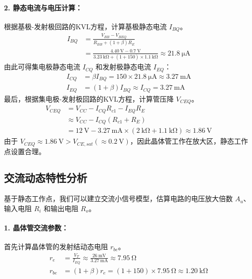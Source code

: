 \documentclass[UTF8, a4paper]{ctexrep} %
\begin{document}
\paragraph{2. 静态电流与电压计算：}
根据基极-发射极回路的KVL方程，计算基极静态电流 $I_{BQ}$。
\begin{align*}
    I_{BQ} &= \frac{V_{BB} - V_{BEQ}}{R_{BB} + (1+\beta)R_E} \\
           &= \frac{\SI{4.40}{\volt} - \SI{0.7}{\volt}}{\SI{3.23}{\kilo\ohm} + (1+150) \times \SI{1.1}{\kilo\ohm}} \approx \SI{21.8}{\micro\ampere}
\end{align*}
由此可得集电极静态电流 $I_{CQ}$ 和发射极静态电流 $I_{EQ}$：
\begin{align*}
    I_{CQ} &= \beta I_{BQ} = 150 \times \SI{21.8}{\micro\ampere} \approx \SI{3.27}{\milli\ampere} \\
    I_{EQ} &= (1+\beta) I_{BQ} \approx I_{CQ} = \SI{3.27}{\milli\ampere}
\end{align*}
最后，根据集电极-发射极回路的KVL方程，计算管压降 $V_{CEQ}$。
\begin{align*}
    V_{CEQ} &= V_{CC} - I_{CQ}R_{c1} - I_{EQ}R_E \\
            &\approx V_{CC} - I_{CQ}(R_{c1} + R_E) \\
            &= \SI{12}{\volt} - \SI{3.27}{\milli\ampere} \times (\SI{2}{\kilo\ohm} + \SI{1.1}{\kilo\ohm}) \approx \SI{1.86}{\volt}
\end{align*}
由于 $V_{CEQ} \approx \SI{1.86}{\volt} > V_{CE,sat} (\approx \SI{0.2}{\volt})$，因此晶体管工作在放大区，静态工作点设置合理。

\subsection{交流动态特性分析}

基于静态工作点，我们可以建立交流小信号模型，估算电路的电压放大倍数 $A_u$、输入电阻 $R_i$ 和输出电阻 $R_o$。

\paragraph{1. 晶体管交流参数：}
首先计算晶体管的发射结动态电阻 $r_{be}$。
\begin{align*}
    r_e &= \frac{V_T}{I_{EQ}} \approx \frac{\SI{26}{\milli\volt}}{\SI{3.27}{\milli\ampere}} \approx \SI{7.95}{\ohm} \\
    r_{be} &= (1+\beta)r_e = (1+150) \times \SI{7.95}{\ohm} \approx \SI{1.20}{\kilo\ohm}
\end{align*}
\end{document}
